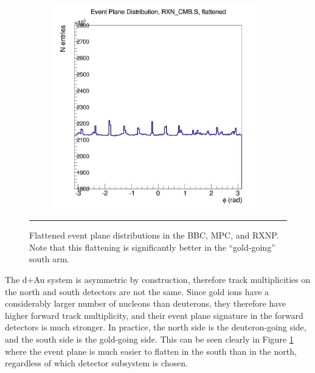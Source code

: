 \begin{figure}
\begin{subfigure}[p]{0.4\textwidth}
    \end{subfigure}
    \begin{subfigure}[p]{0.4\textwidth}
    \includegraphics[width=1\textwidth]{EPflattening/flatrxncmbs.jpg}
    \end{subfigure}
    \rule{35em}{0.5pt}
  \caption[Flattened event plane distributions in the BBC, MPC, and RXNP]{Flattened event plane distributions in the BBC, MPC, and RXNP. Note that this flattening is significantly better in the ``gold-going'' south arm.}
  \label{fig:evtpln}
\end{figure}

The d+Au system is asymmetric by construction, therefore track multiplicities on the north and south detectors are not the same. Since gold ions have a considerably larger number of nucleons than deuterons, they therefore have higher forward track multiplicity, and their event plane signature in the forward detectors is much stronger. In practice, the north side is the deuteron-going side, and the south side is the gold-going side. This can be seen clearly in Figure \ref{fig:evtpln} where the event plane is much easier to flatten in the south than in the north, regardless of which detector subsystem is chosen.

